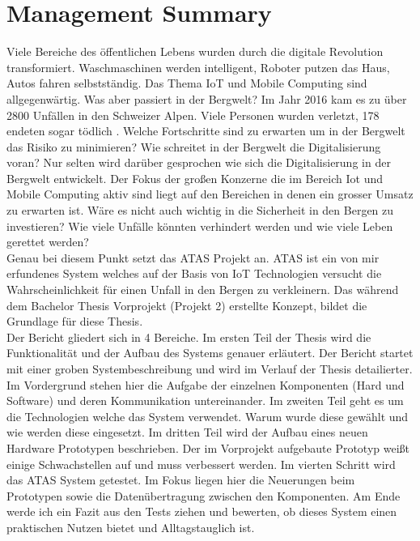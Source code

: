 \documentclass[11pt,english,german]{report}
\theoremstyle{definition}
\begin{document}
\chapter*{Management Summary}
% 
Viele Bereiche des öffentlichen Lebens wurden durch die digitale Revolution transformiert. Waschmaschinen werden intelligent, Roboter putzen das Haus, Autos fahren selbstständig. Das Thema IoT und Mobile Computing sind allgegenwärtig. Was aber passiert in der Bergwelt? Im Jahr 2016 kam es zu über 2800 Unfällen in den Schweizer Alpen. Viele Personen wurden verletzt, 178 endeten sogar tödlich \cite{sacaccident}. Welche Fortschritte sind zu erwarten um in der Bergwelt das Risiko zu minimieren? Wie schreitet in der Bergwelt die Digitalisierung voran? Nur selten wird darüber gesprochen wie sich die Digitalisierung in der Bergwelt entwickelt. Der Fokus der großen Konzerne die im Bereich Iot und Mobile Computing aktiv sind liegt auf den Bereichen in denen ein grosser Umsatz zu erwarten ist. Wäre es nicht auch wichtig in die Sicherheit in den Bergen zu investieren? Wie viele Unfälle könnten verhindert werden und wie viele Leben gerettet werden?\\[0.3cm]
Genau bei diesem Punkt setzt das ATAS Projekt an. ATAS ist ein von mir erfundenes System welches auf der Basis von IoT Technologien versucht die Wahrscheinlichkeit für einen Unfall in den Bergen zu verkleinern. Das während dem Bachelor Thesis Vorprojekt (Projekt 2) erstellte Konzept, bildet die Grundlage für diese Thesis.\\[0.3cm] Der Bericht gliedert sich in 4 Bereiche. Im ersten Teil der Thesis wird die Funktionalität und der Aufbau des Systems genauer erläutert. Der Bericht startet mit einer groben Systembeschreibung und wird im Verlauf der Thesis detailierter. Im Vordergrund stehen hier die Aufgabe der einzelnen Komponenten (Hard und Software) und deren Kommunikation untereinander. Im zweiten Teil geht es um die Technologien welche das System verwendet. Warum wurde diese gewählt und wie werden diese eingesetzt. Im dritten Teil wird der Aufbau eines neuen Hardware Prototypen beschrieben. Der im Vorprojekt aufgebaute Prototyp weißt einige Schwachstellen auf und muss verbessert werden. Im vierten Schritt wird das ATAS System getestet. Im Fokus liegen hier die Neuerungen beim Prototypen sowie die Datenübertragung zwischen den Komponenten. Am Ende werde ich ein Fazit aus den Tests ziehen und bewerten, ob dieses System einen praktischen Nutzen bietet und Alltagstauglich ist.
\end{document}
